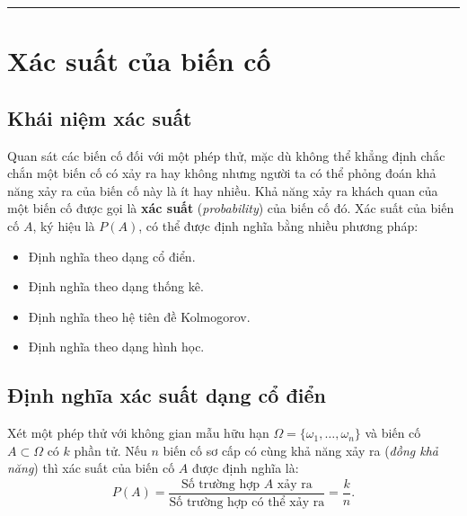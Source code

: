 \vspace{1em}
\hrule
\vspace{1.5em}

\section{Xác suất của biến cố}

\subsection{Khái niệm xác suất}
Quan sát các biến cố đối với một phép thử, mặc dù không thể khẳng định chắc chắn một biến cố có xảy ra hay không nhưng người ta có thể phỏng đoán khả năng xảy ra của biến cố này là ít hay nhiều.
Khả năng xảy ra khách quan của một biến cố được gọi là \textbf{xác suất} (\textit{probability}) của biến cố đó.
Xác suất của biến cố $A$, ký hiệu là $P(A)$, có thể được định nghĩa bằng nhiều phương pháp:
\begin{itemize}[leftmargin=1.5em]
    \item Định nghĩa theo dạng cổ điển.
    \item Định nghĩa theo dạng thống kê.
    \item Định nghĩa theo hệ tiên đề Kolmogorov.
    \item Định nghĩa theo dạng hình học.
\end{itemize}

\subsection{Định nghĩa xác suất dạng cổ điển}
Xét một phép thử với không gian mẫu hữu hạn $\Omega = \{\omega_1, \dots, \omega_n\}$ và biến cố $A \subset \Omega$ có $k$ phần tử. Nếu $n$ biến cố sơ cấp có cùng khả năng xảy ra (\textit{đồng khả năng}) thì xác suất của biến cố $A$ được định nghĩa là:
\[
P(A) = \frac{\text{Số trường hợp } A \text{ xảy ra}}{\text{Số trường hợp có thể xảy ra}} = \frac{k}{n}.
\]

